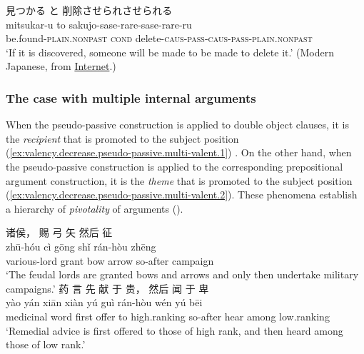 \documentclass[UTF8, a4paper, oneside, scheme=plain, 12pt]{ctexrep}
\newcommand*{\citepage}[1]{p.~{#1}}
\newcommand*{\term}[1]{\emph{#1}}
\newcommand{\translate}[1]{`#1'}
\newcommand*{\category}[1]{\textsc{#1}}
\begin{document}
\begin{exe}
    \ex\label{ex:valency.passive.pseudo-passive.alternate-caus.japanese}
    \glll 見つかる と 削除させられさせられる \\
    mitsukar-u to sakujo-sase-rare-sase-rare-ru \\
    be.found-\category{plain}.\category{nonpast} \category{cond} delete-\category{caus}-\category{pass}-\category{caus}-\category{pass}-\category{plain}.\category{nonpast} \\
    \glt\translate{If it is discovered, someone will be made to be made to delete it.} (Modern Japanese, from \href{https://kuroisi.com/blog/2253.html}{Internet}.)
\end{exe}

\subsubsection{The case with multiple internal arguments}\label{sec:grammatical.clause.verbal.argument-structure.pseudo-passive.multiple-argument}

When the pseudo-passive construction is applied to double object clauses,
it is the \emph{recipient} that is promoted to the subject position 
(\ref{ex:valency.decrease.pseudo-passive.multi-valent.1}) \citep[\citepage{421}]{meiguang2018}.
On the other hand, when the pseudo-passive construction is applied to the corresponding prepositional argument construction,
it is the \emph{theme} that is promoted to the subject position
(\ref{ex:valency.decrease.pseudo-passive.multi-valent.2}).
These phenomena establish a hierarchy of \term{pivotality} of arguments ().

\begin{exe}
    \ex\label{ex:valency.decrease.pseudo-passive.multi-valent.1}
    \glll 诸侯， 赐 弓 矢 然后 征 \\
    zhū-hóu cì gōng shǐ rán-hòu zhēng \\
    various-lord grant bow arrow so-after campaign \\
    \glt\translate{The feudal lords are granted bows and arrows and only then undertake military campaigns.}
    \ex\label{ex:valency.decrease.pseudo-passive.multi-valent.2}
    \glll 药 言 先 献 于 贵， 然后 闻 于 卑 \\
    yào yán xiān xiàn yú guì rán-hòu wén yú bēi \\
    medicinal word first offer to high.ranking so-after hear among low.ranking \\
    \glt\translate{Remedial advice is first offered to those of high rank, and then heard among those of low rank.}
\end{exe}
\end{document}
